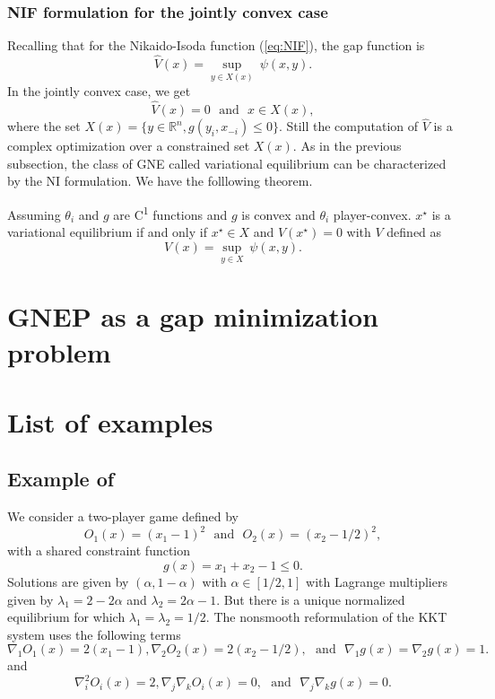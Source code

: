 \documentclass[11pt, a4paper]{article}
\newcommand{\txtm}[1]{\textrm{~~#1~~}}
\newcommand{\expo}{\textsuperscript}
\newcommand{\R}{\ensuremath{\mathbb{R}}}
\begin{document}
\subsubsection{NIF formulation for the jointly convex case}



Recalling that for the Nikaido-Isoda function (\ref{eq:NIF}), the gap function is
$$
\hat V(x) = \underset{ y \in X(x) }{\sup}~ \psi(x,y).
$$
In the jointly convex case, we get
\begin{equation}
\hat V(x) = 0
\txtm{and} 
x \in X(x),
\label{eq:NIF:joint}
\end{equation}
where the set $X(x) = \{y \in \R^n, g(y_i, x_{-i}) \leq 0 \}$. Still the computation of $\hat V$ is a complex optimization over a constrained set $X(x)$.
As in the previous subsection, the class of GNE called variational equilibrium can be characterized by the NI formulation.  We have the folllowing theorem.


Assuming $\theta_i$ and $g$ are C\expo{1} functions and $g$ is convex and $\theta_i$ player-convex. $x^\star$ is a variational equilibrium if and only if $x^\star \in X$ and $V(x^\star)=0$ with $V$ defined as
$$
V(x) = \underset{ y \in X }{\sup}~ \psi(x,y).
$$








\section{GNEP as a gap minimization problem}






\section{List of examples}

\subsection{Example of \cite{facchineietal07}}
We consider a two-player game defined by 
$$
O_1(x) = (x_1-1)^2 
\txtm{and}
O_2(x) = (x_2-1/2)^2,  
$$
with a shared constraint function
$$
g(x) = x_1 + x_2 - 1 \leq 0.
$$
Solutions are given by $(\alpha, 1-\alpha)$ with $\alpha \in [1/2, 1]$ with Lagrange multipliers given by $\lambda_1 = 2 - 2\alpha$ and $\lambda_2 = 2\alpha - 1$.
But there is a unique normalized equilibrium for which $\lambda_1=\lambda_2=1/2$.
The nonsmooth reformulation of the KKT system uses the following terms
$$
\nabla_1 O_1(x) = 2(x_1-1),
\nabla_2 O_2(x) = 2(x_2-1/2),
\txtm{and}
\nabla_1 g(x) = \nabla_2 g(x) = 1.
$$
and 
$$
\nabla_i^2 O_i(x) = 2,
\nabla_j \nabla_k O_i(x) = 0,
\txtm{and}
\nabla_j \nabla_k g(x) = 0.
$$
\end{document}
